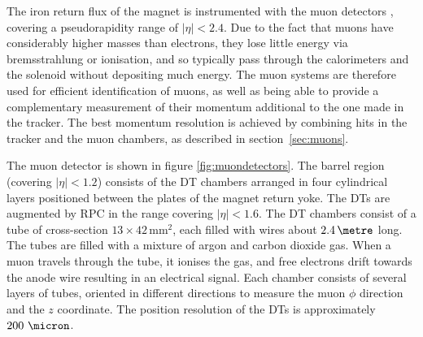 The iron return flux of the magnet is instrumented with the muon detectors
\cite{Chatrchyan:2008aa}, covering a pseudorapidity range of $|\eta|<2.4$. Due
to the fact that muons have considerably higher masses than electrons, they lose
little energy via bremsstrahlung or ionisation, and so typically pass through
the calorimeters and the solenoid without depositing much energy. The muon
systems are therefore used for efficient identification of muons, as well as
being able to provide a complementary measurement of their momentum additional
to the one made in the tracker. The best momentum resolution is achieved by 
combining hits in the tracker and the muon chambers, as described in section~\ref{sec:muons}. 

The muon detector is shown in figure \ref{fig:muondetectors}. The barrel region
(covering $|\eta|<1.2$) consists of the \ac{DT} chambers arranged in four
cylindrical layers positioned between the plates of the magnet return yoke. The
\ac{DT}s are augmented by \ac{RPC} in the range covering $|\eta|<1.6$. The
\ac{DT} chambers consist of a tube of cross-section $13\times42\,\text{mm}^{2}$,
each filled with wires about $2.4\,\metre$ long. The tubes are filled with a
mixture of argon and carbon dioxide gas. When a muon travels through the tube,
it ionises the gas, and free electrons drift towards the anode wire resulting in
an electrical signal. Each chamber consists of several layers of tubes, oriented
in different directions to measure the muon $\phi$ direction and the $z$
coordinate. The position resolution of the \ac{DT}s is approximately
$200~\micron$.

